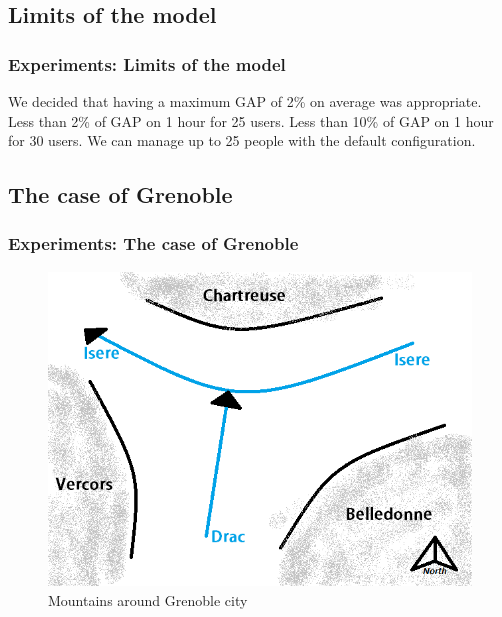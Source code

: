 \documentclass{beamer}
\begin{document}
	\subsection{Limits of the model}
	\begin{frame}
		\frametitle{Experiments: Limits of the model}
		We decided that having a maximum GAP of 2\% on average was appropriate. \newline
		Less than 2\% of GAP on 1 hour for 25 users.\newline
		Less than 10\% of GAP on 1 hour for 30 users. \newline
		We can manage up to 25 people with the default configuration.
	\end{frame}
	\subsection{The case of Grenoble}
	\begin{frame}
		\frametitle{Experiments: The case of Grenoble}
		\begin{figure}
		\centering
			\includegraphics[height=0.5\textwidth]{img/i_grenoble.png}
		\caption{Mountains around Grenoble city}
		\label{fig:Mountains around Grenoble city}
	\end{figure}
	\end{frame}
\end{document}
